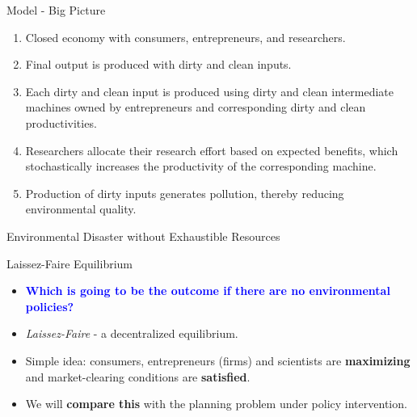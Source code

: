 \documentclass[aspectratio=169,xcolor=dvipsnames]{beamer}
\begin{document}
\begin{frame}{Model - Big Picture}
    \begin{enumerate}
\item Closed economy with consumers, entrepreneurs, and researchers. 
\item Final output is produced with dirty and clean inputs.
\item Each dirty and clean input is produced using dirty and clean intermediate machines owned by entrepreneurs and corresponding dirty and clean productivities.
\item Researchers allocate their research effort based on expected benefits, which stochastically increases the productivity of the corresponding machine.
\item Production of dirty inputs generates pollution, thereby reducing environmental quality. 
    \end{enumerate}
\end{frame}

\begin{frame}{}
\centering
\Large Environmental Disaster without Exhaustible Resources 
\end{frame}

\begin{frame}{Laissez-Faire Equilibrium}
    \begin{itemize}
        \item \textcolor{Blue}{\textbf{Which is going to be the outcome if there are no environmental policies?}}
        \item \textit{Laissez-Faire} - a decentralized equilibrium.
        \item Simple idea: consumers, entrepreneurs (firms) and scientists are \textbf{maximizing} and market-clearing conditions are \textbf{satisfied}.
        \item We will \textbf{compare this} with the planning problem under policy intervention.
    \end{itemize}
\end{frame}
\end{document}
